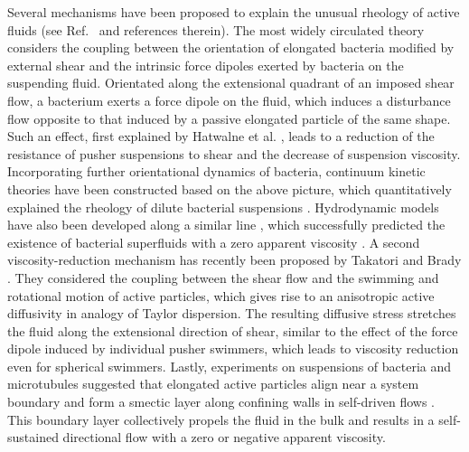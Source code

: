 Several mechanisms have been proposed to explain the unusual rheology of active fluids (see Ref.~\cite{Saintillan2018} and references therein). The most widely circulated theory considers
the coupling between the orientation of elongated bacteria modified by external shear and the intrinsic force dipoles exerted by bacteria on the suspending fluid. Orientated along the extensional quadrant of an imposed shear flow, a bacterium exerts a force dipole on the fluid, which induces a disturbance flow opposite to that induced by a passive elongated particle of the same shape.
Such an effect, first explained by Hatwalne et al. \cite{Hatwalne2004}, leads to a reduction of the resistance of pusher suspensions to shear and the decrease of suspension viscosity. Incorporating further orientational dynamics of bacteria, continuum kinetic theories have been constructed based on the above picture, which quantitatively explained the rheology of dilute bacterial suspensions
\cite{Haines2009, Saintillan2010, Ryan2011, Moradi2015, Alonso-Matilla2016, Bechtel2017}.
Hydrodynamic models have also been developed along a similar line \cite{Cates2008, Giomi2010, Somka2017}, which successfully predicted the existence of bacterial superfluids with a zero apparent viscosity \cite{Marchetti2015}.
A second viscosity-reduction mechanism has recently been proposed by Takatori and Brady \cite{Takatori2014a, Takatori2014b, Takatori2017}. They considered the coupling between the shear flow and the swimming and rotational motion of active particles, which gives rise to an anisotropic active diffusivity in analogy of Taylor dispersion. The resulting diffusive stress stretches the fluid along the extensional direction of shear, similar to the effect of the force dipole induced by individual pusher swimmers, which leads to viscosity reduction even for spherical swimmers.
Lastly, experiments on suspensions of bacteria and microtubules suggested that elongated active particles align near a system boundary and form a smectic layer along confining walls in self-driven flows \cite{Wioland2016, Wu2017, Lushi2014}.
This boundary layer collectively propels the fluid in the bulk and results in a self-sustained directional flow with a zero or negative apparent
viscosity.

